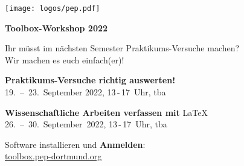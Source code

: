 \documentclass[paper=landscape]{scrartcl}
\begin{document}
  \begin{minipage}{0.25\textwidth}%
    \texttt{[image: logos/pep.pdf]}%
  \end{minipage}%
  \begin{minipage}{0.75\textwidth}%
    \centering\fontsize{50}{60}\bfseries\selectfont Toolbox-Workshop 2022%
  \end{minipage}%

  \vspace{0.5cm}

  \begin{center}
    \Huge Ihr müsst im nächsten Semester Praktikums-Versuche machen? \\[0.5\baselineskip]
    Wir machen es euch einfach(er)!
  \end{center}

  \vspace{0.5cm}

  \begin{center}
    \huge \textbf{Praktikums-Versuche richtig auswerten!} \\[0.5\baselineskip]
    19.~–~23.~September 2022, 13\,-\,17~Uhr, tba
  \end{center}
  \vspace{0.5cm}
  \begin{center}
    \huge \textbf{Wissenschaftliche Arbeiten verfassen mit} \textrm{\LaTeX}\\[0.5\baselineskip]
    26.~–~30.~September~2022, 13\,-\,17~Uhr, tba
  \end{center}
  \vspace{0.5cm}
  \begin{center}
    \large Software installieren und \textbf{Anmelden}: \\
    \Huge \href{https://toolbox.pep-dortmund.org}{toolbox.pep-dortmund.org}
  \end{center}

\end{document}
